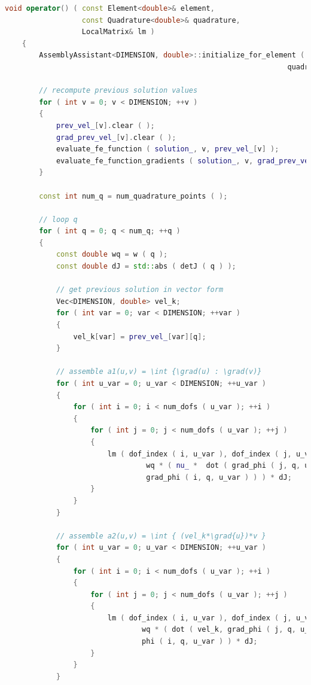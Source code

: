 \documentclass[a4paper, 11pt, twoside]{article}
\begin{document}
\begin{lstlisting}[language=C++, basicstyle={\footnotesize, \ttfamily}, keywordstyle=\color{blue},  numbers=none, tabsize=4]
void operator() ( const Element<double>& element, 
                  const Quadrature<double>& quadrature,
                  LocalMatrix& lm )
    {
        AssemblyAssistant<DIMENSION, double>::initialize_for_element ( element,
                                                                  quadrature );

        // recompute previous solution values
        for ( int v = 0; v < DIMENSION; ++v )
        {
            prev_vel_[v].clear ( );
            grad_prev_vel_[v].clear ( );
            evaluate_fe_function ( solution_, v, prev_vel_[v] );
            evaluate_fe_function_gradients ( solution_, v, grad_prev_vel_[v] );
        }

        const int num_q = num_quadrature_points ( );

        // loop q
        for ( int q = 0; q < num_q; ++q )
        {
            const double wq = w ( q );
            const double dJ = std::abs ( detJ ( q ) );

            // get previous solution in vector form
            Vec<DIMENSION, double> vel_k;
            for ( int var = 0; var < DIMENSION; ++var )
            {
                vel_k[var] = prev_vel_[var][q];
            }

            // assemble a1(u,v) = \int {\grad(u) : \grad(v)}
            for ( int u_var = 0; u_var < DIMENSION; ++u_var )
            {
                for ( int i = 0; i < num_dofs ( u_var ); ++i )
                {
                    for ( int j = 0; j < num_dofs ( u_var ); ++j )
                    {
                        lm ( dof_index ( i, u_var ), dof_index ( j, u_var ) ) += 
                                 wq * ( nu_ *  dot ( grad_phi ( j, q, u_var ), 
                                 grad_phi ( i, q, u_var ) ) ) * dJ;
                    }
                }
            }

            // assemble a2(u,v) = \int { (vel_k*\grad{u})*v }
            for ( int u_var = 0; u_var < DIMENSION; ++u_var )
            {
                for ( int i = 0; i < num_dofs ( u_var ); ++i )
                {
                    for ( int j = 0; j < num_dofs ( u_var ); ++j )
                    {
                        lm ( dof_index ( i, u_var ), dof_index ( j, u_var ) ) +=
                                wq * ( dot ( vel_k, grad_phi ( j, q, u_var ) ) * 
                                phi ( i, q, u_var ) ) * dJ;
                    }
                }
            }


\end{lstlisting}
\end{document}
